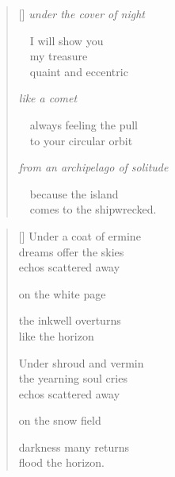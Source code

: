 \documentclass[14pt]{extbook}
\newcommand*{\centeredornament}{\centerline{\pgfornament[width=6cm]{88}}}
\begin{document}
\newpage


\begin{verse}[\versewidth]
  \emph{under the cover of night}

  \ \ I will show you \\
  \ \ my treasure \\
  \ \ quaint and eccentric

  \emph{like a comet}

  \ \ always feeling the pull \\
  \ \ to your circular orbit

  \emph{from an archipelago of solitude}

  \ \ because the island \\
  \ \ comes to the shipwrecked.
\end{verse}


\newpage

\vspace*{-15mm}
\centeredornament
\vspace*{-7mm}


\settowidth{\versewidth}{Under shroud and vermin}

\begin{verse}[\versewidth]
  Under a coat of ermine \\
  dreams offer the skies \\
  echos scattered away

  on the white page

  the inkwell overturns \\
  like the horizon

  Under shroud and vermin \\
  the yearning soul cries \\
  echos scattered away

  on the snow field

  darkness many returns \\
  flood the horizon.
\end{verse}


\newpage

\vspace*{-15mm}
\centeredornament
\vspace*{-7mm}
\end{document}
